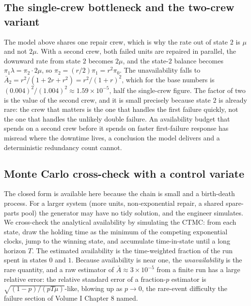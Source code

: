 \subsection{The single-crew bottleneck and the two-crew variant}

The model above shares one repair crew, which is why the rate out of
state $2$ is $\mu$ and not $2\mu$. With a second crew, both failed units
are repaired in parallel, the downward rate from state $2$ becomes
$2\mu$, and the state-$2$ balance becomes $\pi_{1}\lambda = \pi_{2}\cdot
2\mu$, so $\pi_{2} = (r/2)\pi_{1} = r^{2}\pi_{0}$. The unavailability
falls to $\bar A_{2} = r^{2}/(1 + 2r + r^{2}) = r^{2}/(1 + r)^{2}$,
which for the base numbers is $(0.004)^{2}/(1.004)^{2} \approx 1.59
\times 10^{-5}$, half the single-crew figure. The factor of two is the
value of the second crew, and it is small precisely because state $2$ is
already rare: the crew that matters is the one that handles the first
failure quickly, not the one that handles the unlikely double failure.
An availability budget that spends on a second crew before it spends on
faster first-failure response has misread where the downtime lives, a
conclusion the model delivers and a deterministic redundancy count
cannot.

\subsection{Monte Carlo cross-check with a control variate}

The closed form is available here because the chain is small and a
birth-death process. For a larger system (more units, non-exponential
repair, a shared spare-parts pool) the generator may have no tidy
solution, and the engineer simulates. We cross-check the analytical
availability by simulating the CTMC: from each state, draw the holding
time as the minimum of the competing exponential clocks, jump to the
winning state, and accumulate time-in-state until a long horizon $T$.
The estimated availability is the time-weighted fraction of the run
spent in states $0$ and $1$. Because availability is near one, the
\emph{unavailability} is the rare quantity, and a raw estimator of
$\bar A \approx 3 \times 10^{-5}$ from a finite run has a large relative
error: the relative standard error of a fraction-$p$ estimator is
$\sqrt{(1 - p)/(pT\mu)}$-like, blowing up as $p \to 0$, the rare-event
difficulty the failure section of Volume I Chapter 8 named.

